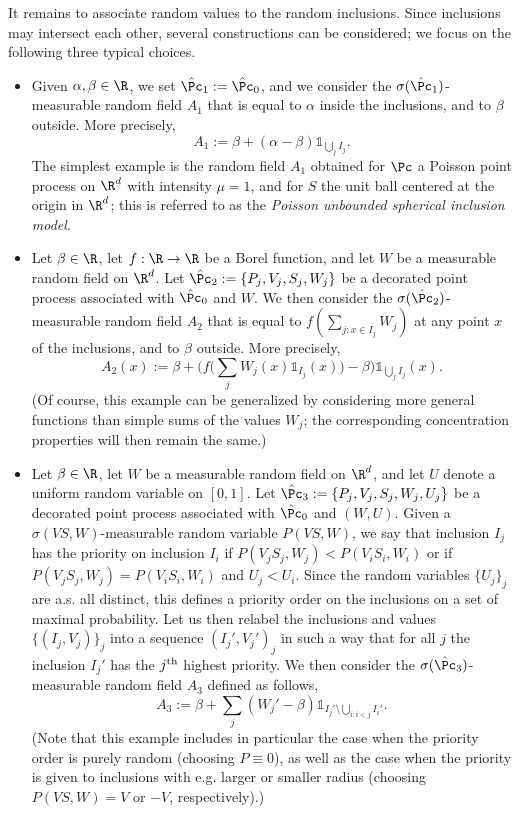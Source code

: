 It remains to associate random values to the random inclusions. Since inclusions may intersect each other, several constructions can be considered; we focus on the following three typical choices.
\begin{itemize}
\item Given $\alpha,\beta\in\R$, we set $\hat\Pc_1:=\hat\Pc_0$, and we consider the $\sigma(\hat\Pc_1)$-measurable random field $A_1$ that is equal to $\alpha$ inside the inclusions, and to $\beta$ outside. More precisely,
\[
A_1:=\beta+(\alpha-\beta)\mathds1_{\bigcup_jI_j}.
\]
The simplest example is the random field $A_1$ obtained for $\Pc$ a Poisson point process on $\R^d$ with intensity $\mu=1$, and for $S$ the unit ball centered at the origin in $\R^d$; this is referred to as the \emph{Poisson unbounded spherical inclusion model}.

\item Let $\beta\in\R$, let $f:\R\to\R$ be a Borel function, and let $W$ be a measurable random field on $\R^d$. Let $\hat\Pc_2:=\{P_j,V_j,S_j,W_j\}$ be a decorated point process associated with $\hat\Pc_0$ and $W$. We then consider the $\sigma(\hat\Pc_2)$-measurable random field $A_2$ that is equal to $f(\sum_{j:x\in I_j}W_j)$ at any point $x$ of the inclusions, and to $\beta$ outside. More precisely,
\[
A_2(x):=\beta+\bigg(f\Big(\sum_{j}W_j(x)\mathds1_{I_j}(x)\Big)-\beta\bigg)\mathds1_{\bigcup_jI_j}(x).
\]
(Of course, this example can be generalized by considering more general functions than simple sums of the values $W_j$; the corresponding concentration properties will then remain the same.)
\item Let $\beta\in\R$, let $W$ be a measurable random field on $\R^d$, and let $U$ denote a uniform random variable on $[0,1]$. Let $\hat\Pc_3:=\{P_j,V_j,S_j,W_j,U_j\}$ be a decorated point process associated with $\hat\Pc_0$ and $(W,U)$. Given a $\sigma(VS,W)$-measurable random variable $P(VS,W)$, we say that inclusion $I_j$ has the priority on inclusion $I_i$ if $P(V_jS_j,W_j)<P(V_iS_i,W_i)$ or if $P(V_jS_j,W_j)=P(V_iS_i,W_i)$ and $U_j<U_i$. Since the random variables $\{U_j\}_j$ are a.s. all distinct, this defines a priority order on the inclusions on a set of maximal probability. Let us then relabel the inclusions and values $\{(I_j,V_j)\}_j$ into a sequence $(I_j',V_j')_j$ in such a way that for all $j$ the inclusion $I_j'$ has the $j^{\rm th}$ highest priority. We then consider the $\sigma(\hat\Pc_3)$-measurable random field $A_3$ defined as follows,
\[
A_3:=\beta+\sum_j(W_j'-\beta)\mathds1_{I_j'\setminus\bigcup_{i:i<j}I_i'}.
\]
(Note that this example includes in particular the case when the priority order is purely random (choosing $P\equiv0$), as well as the case when the priority is given to inclusions with e.g. larger or smaller radius (choosing $P(VS,W)=V$ or $-V$, respectively).)
\end{itemize}
